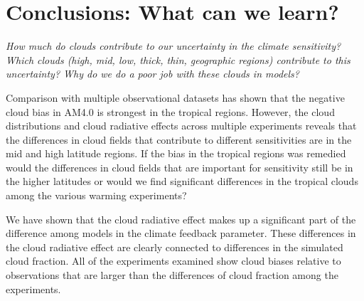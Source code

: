 \documentclass[draft]{agujournal2019}
\begin{document}
%


\section{Conclusions: What can we learn?}

\textit{How much do clouds contribute to our uncertainty in the climate sensitivity?  
Which clouds (high, mid, low, thick, thin, geographic regions) contribute to this uncertainty?
Why do we do a poor job with these clouds in models? }

Comparison with multiple observational datasets has shown that the negative cloud bias
in AM4.0 is strongest in the tropical regions.  However, the cloud distributions and 
cloud radiative effects across multiple experiments reveals that the differences in cloud fields that 
contribute to different sensitivities are in the mid and high latitude regions.  If the bias in 
the tropical regions was remedied would the differences in cloud fields that are important for sensitivity
still be in the higher latitudes or would we find significant differences in the tropical clouds among 
the various warming experiments?     

We have shown that the cloud radiative effect makes up a significant part of the difference 
among models in the climate feedback parameter.  These differences in the cloud radiative
effect are clearly connected to differences in the simulated cloud fraction.  
All of the experiments examined show cloud biases relative to observations that are larger than the differences of cloud fraction among the experiments.      
\end{document}
